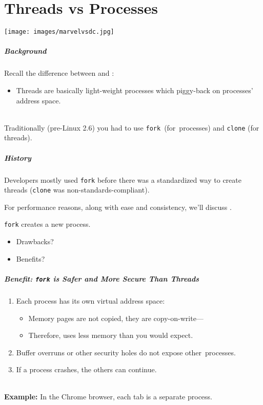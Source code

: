 \part{Threads vs Processes}
\begin{frame}
\partpage
\begin{center}
	\texttt{[image: images/marvelvsdc.jpg]}
\end{center}
\end{frame}


\begin{frame}[fragile]
  \frametitle{Background}


  Recall the difference between  and 
          :
  \begin{itemize}
    \item Threads are basically light-weight processes which piggy-back on
          processes' address space.
  \end{itemize} ~\\
  Traditionally (pre-Linux 2.6) you had to use {\tt fork}~(for~processes) and {\tt clone} (for threads).


\end{frame}

\begin{frame}[fragile]
  \frametitle{History}


    Developers mostly used {\tt fork} before there was a standardized way to create threads ({\tt clone} was non-standards-compliant).

  For performance reasons, along with ease and consistency, we'll discuss
  .

  {\tt fork} creates a new process.
      \begin{itemize}
        \item Drawbacks?
        \item Benefits?
      \end{itemize}
  
\end{frame}

\begin{frame}[fragile]
  \frametitle{Benefit: {\tt fork} is Safer and More Secure Than Threads}

  \begin{enumerate}
    \item Each process has its own virtual address space:
      \begin{itemize}
        \item Memory pages are not copied, they are copy-on-write---
        \item Therefore, uses less memory than you would expect.
      \end{itemize}
    \item Buffer overruns or other security holes do not expose other~processes.
    \item If a process crashes, the others can continue.
  \end{enumerate}~\\[1em]
  {\bf Example:} In the Chrome browser, each tab is a separate process.
\end{frame}

